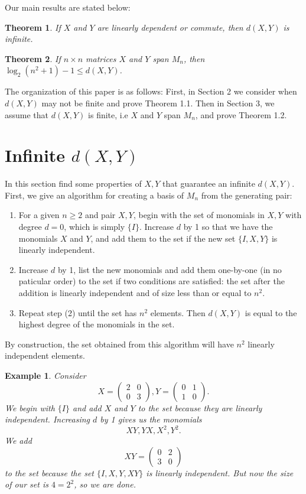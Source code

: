 \documentclass[11pt]{amsart}
\newtheorem{theorem}{Theorem}
\numberwithin{equation}{section}
\numberwithin{figure}{section}
\numberwithin{theorem}{section}
\newtheorem{example}{Example}
\begin{document}
Our main results are stated below: 
\begin{theorem}
If $X$ and $Y$ are linearly dependent or commute, then $d(X,Y)$ is infinite. 
\end{theorem}
\begin{theorem}
If $n\times n$ matrices $X$ and $Y$ span $M_n$, then $\log_2(n^2+1)-1\leq d(X,Y)$. 
\end{theorem}

The organization of this paper is as follows: First, in Section 2 we consider when $d(X,Y)$ may not be finite and prove Theorem 1.1. Then in Section 3, we assume that $d(X,Y)$ is finite, i.e $X$ and $Y$ span $M_n$, and prove Theorem 1.2. 
\section{Infinite $d(X,Y)$}
In this section find some properties of $X,Y$ that guarantee an infinite $d(X,Y)$. First, we give an algorithm for creating a basis of $M_n$ from the generating pair: 
\begin{enumerate}
    \item For a given $n\geq2$ and pair $X,Y$, begin with the set of monomials in $X,Y$ with degree $d=0$, which is simply $\{I\}$. Increase $d$ by 1 so that we have the monomials $X$ and $Y$, and add them to the set if the new set $\{I,X,Y\}$ is linearly independent.  
    \item Increase $d$ by 1, list the new monomials and add them one-by-one (in no paticular order) to the set if two conditions are satisfied: the set after the addition is linearly independent and of size less than or equal to $n^2$.  
    \item Repeat step (2) until the set has $n^2$ elements. Then $d(X,Y)$ is equal to the highest degree of the monomials in the set. 
\end{enumerate}
By construction, the set obtained from this algorithm will have $n^2$ linearly independent elements. 
\begin{example}
Consider $$X=\begin{pmatrix}2&0\\0&3\end{pmatrix}, Y=\begin{pmatrix}0&1\\1&0\end{pmatrix}.$$ We begin with $\{I\}$ and add $X$ and $Y$ to the set because they are linearly independent. Increasing $d$ by 1 gives us the monomials $$XY,YX,X^2,Y^2.$$ We add $$XY=\begin{pmatrix}0&2\\3&0\end{pmatrix}$$ to the set because the set $\{I,X,Y,XY\}$ is linearly independent. But now the size of our set is $4=2^2$, so we are done. 
\end{example}
\end{document}
